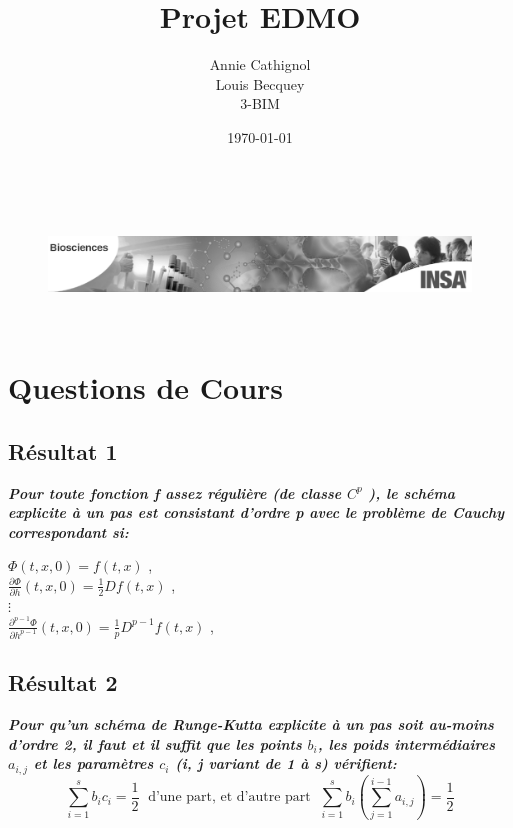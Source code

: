 \documentclass[a4paper,12pt,landscape]{article}
\begin{document}
\title{Projet EDMO}
\author{Annie Cathignol\\Louis Becquey\\3-BIM}
\date{\today}
\maketitle

\begin{center}
\begin{figure}[b!]
\includegraphics[height=3.2cm]{InsaBioLogo3.png}
\end{figure}
\end{center}

\newpage

\section{Questions de Cours}
\subsection{Résultat 1}
{\it \bf Pour toute fonction f assez régulière (de classe $C^{p}$ ), le schéma explicite à un pas est consistant d’ordre p avec le problème de Cauchy correspondant si:}\\
\begin{center}
$\Phi (t,x,0) = f(t,x)$ ,  \\
$\frac{\partial \Phi}{\partial h} (t,x,0) = \frac{1}{2}Df(t,x)$ , \\
$\vdots$ \\
$\frac{\partial^{p-1}\Phi}{\partial h^{p-1}} (t,x,0) = \frac{1}{p}D^{p-1}f(t,x)$ , \\
\end{center}


\subsection{Résultat 2}
{\it \bf Pour qu’un schéma de Runge-Kutta explicite à un pas soit au-moins d’ordre 2, il faut et il suffit que les points $b_{i}$, les poids intermédiaires $a_{i,j}$ et les paramètres $c_{i}$ (i, j variant de 1 à s) vérifient:} $$\sum_{i=1}^{s}b_{i}c_{i} = \frac{1}{2} \; \textrm{   d'une part, et d'autre part   } \; \sum_{i=1}^{s}b_{i}(\sum_{j=1}^{i-1}a_{i,j})= \frac{1}{2}$$
\end{document}
